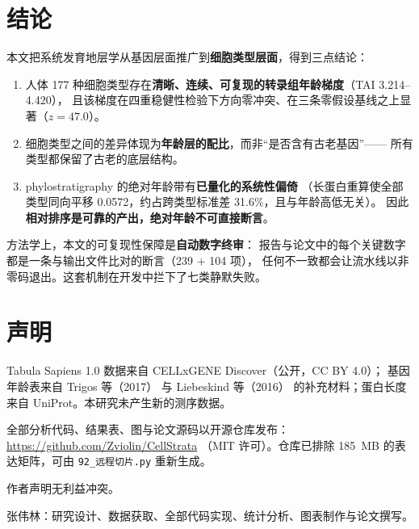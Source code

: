 \documentclass[UTF8, a4paper, 11pt]{ctexart}
\newcommand{\tai}{\textsc{TAI}}
\newcommand{\code}[1]{\texttt{\small #1}}
\begin{document}
\section{结论}

本文把系统发育地层学从基因层面推广到\textbf{细胞类型层面}，得到三点结论：

\begin{enumerate}[label=(\arabic*)]
  \item 人体 177 种细胞类型存在\textbf{清晰、连续、可复现的转录组年龄梯度}（\tai{} 3.214--4.420），
        且该梯度在四重稳健性检验下方向零冲突、在三条零假设基线之上显著（$z = 47.0$）。
  \item 细胞类型之间的差异体现为\textbf{年龄层的配比}，而非“是否含有古老基因”——
        所有类型都保留了古老的底层结构。
  \item phylostratigraphy 的绝对年龄带有\textbf{已量化的系统性偏倚}
        （长蛋白重算使全部类型同向平移 0.0572，约占跨类型标准差 31.6\%，且与年龄高低无关）。
        因此\textbf{相对排序是可靠的产出，绝对年龄不可直接断言}。
\end{enumerate}

方法学上，本文的可复现性保障是\textbf{自动数字终审}：
报告与论文中的每个关键数字都是一条与输出文件比对的断言（239 $+$ 104 项），
任何不一致都会让流水线以非零码退出。这套机制在开发中拦下了七类静默失败。

\section*{声明}

Tabula Sapiens 1.0 数据来自 CELLxGENE Discover（公开，CC BY 4.0）\citep{conservation2020}；
基因年龄表来自 Trigos 等（2017）\citep{trigos2017} 与 Liebeskind 等（2016）\citep{liebeskind2016}
的补充材料；蛋白长度来自 UniProt。本研究未产生新的测序数据。

\vspace{0.35em}
全部分析代码、结果表、图与论文源码以开源仓库发布：\url{https://github.com/Zviolin/CellStrata}
（MIT 许可）。仓库已排除 185~MB 的表达矩阵，可由 \code{92\_远程切片.py} 重新生成。

\vspace{0.35em}
作者声明无利益冲突。

\vspace{0.35em}
张伟林：研究设计、数据获取、全部代码实现、统计分析、图表制作与论文撰写。
\end{document}
